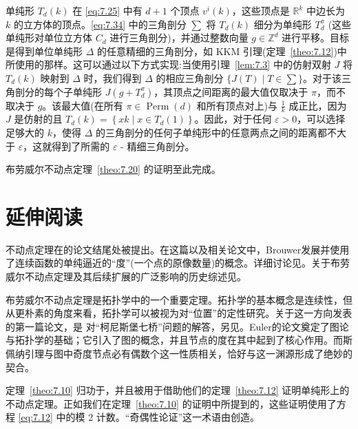 单纯形 \({T}_{d}\left( k\right)\) 在 \eqref{eq:7.25} 中有 \(d + 1\) 个顶点 \({v}^{i}\left( k\right)\)，这些顶点是 \({\mathbb{R}}^{k}\) 中边长为 \(k\) 的立方体的顶点。\eqref{eq:7.34} 中的三角剖分 \(\sum\) 将 \({T}_{d}\left( k\right)\) 细分为单纯形 \({T}_{d}^{\pi }\) (这些单纯形对单位立方体 \({C}_{d}\) 进行三角剖分)，并通过整数向量 \(g \in  {\mathbb{Z}}^{d}\) 进行平移。目标是得到单位单纯形 \(\Delta\) 的任意精细的三角剖分，如 KKM 引理(定理~\ref{theo:7.12})中所使用的那样。这可以通过以下方式实现:当使用引理~\ref{lem:7.3} 中的仿射双射 \(J\) 将 \({T}_{d}\left( k\right)\) 映射到 \(\Delta\) 时，我们得到 \(\Delta\) 的相应三角剖分 \(\{ J\left( T\right)  \mid  T \in  \sum \}\)。对于该三角剖分的每个子单纯形 \(J\left( {g + {T}_{d}^{\pi }}\right)\)，其顶点之间距离的最大值仅取决于 \(\pi\)，而不取决于 \(g\)。该最大值(在所有 \(\pi  \in  \operatorname{Perm}\left( d\right)\) 和所有顶点对上)与 \(\frac{1}{k}\) 成正比，因为 \(J\) 是仿射的且 \({T}_{d}\left( k\right)  = \left\{  {{xk} \mid  x \in  {T}_{d}\left( 1\right) }\right\}\)。因此，对于任何 \(\varepsilon  > 0\)，可以选择足够大的 \(k\)，使得 \(\Delta\) 的三角剖分的任何子单纯形中的任意两点之间的距离都不大于 \(\varepsilon\)，这就得到了所需的 \(\varepsilon\) - 精细三角剖分。

布劳威尔不动点定理~\ref{theo:7.20} 的证明至此完成。

\section{延伸阅读}\label{sec-7.8}

不动点定理在\citet[Satz~4]{brouwer1911}的论文结尾处被提出。在这篇以及相关论文中，Brouwer发展并使用了连续函数的单纯逼近的“度”(一个点的原像数量)的概念。详细讨论见\citet{brouwer1976}。关于布劳威尔不动点定理及其后续扩展的广泛影响的历史综述见\citet{park1999}。

布劳威尔不动点定理是拓扑学中的一个重要定理。拓扑学的基本概念是连续性，但从更朴素的角度来看，拓扑学可以被视为对“位置”的定性研究。关于这一方向发表的第一篇论文，是 \citet{euler1741} 对“柯尼斯堡七桥”问题的解答，另见\citep*{biggs1976}。Euler的论文奠定了图论与拓扑学的基础；它引入了图的概念，并且节点的度在其中起到了核心作用。而斯佩纳引理与图中奇度节点必有偶数个这一性质相关，恰好与这一渊源形成了绝妙的契合。

定理~\ref{theo:7.10} 归功于\citet{sperner1928}，并且被\citet*{knaster1929}用于借助他们的定理~\ref{theo:7.12} 证明单纯形上的不动点定理。正如我们在定理~\ref{theo:7.10} 的证明中所提到的，这些证明使用了方程 \eqref{eq:7.12} 中的模 2 计数。“奇偶性论证”这一术语由\citet{papadimitriou1994}创造。

